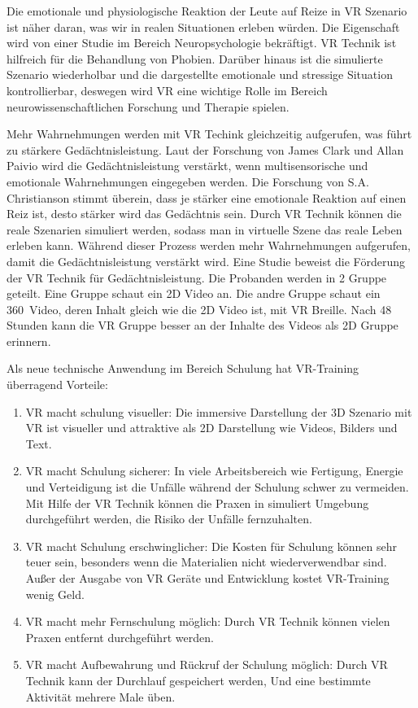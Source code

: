 Die emotionale und physiologische Reaktion der Leute auf Reize in VR Szenario ist näher daran, was wir in realen Situationen erleben würden. Die Eigenschaft wird von einer Studie im Bereich Neuropsychologie bekräftigt. VR Technik ist hilfreich für die Behandlung von Phobien\citep{12}. Darüber hinaus ist die simulierte Szenario wiederholbar und die dargestellte emotionale und stressige Situation kontrollierbar, deswegen wird VR eine wichtige Rolle im Bereich neurowissenschaftlichen Forschung und Therapie spielen.\citep{13}

Mehr Wahrnehmungen werden mit VR Techink gleichzeitig aufgerufen, was führt zu stärkere Gedächtnisleistung. Laut der Forschung von James Clark und Allan Paivio\citep{10} wird die Gedächtnisleistung verstärkt, wenn multisensorische und emotionale Wahrnehmungen eingegeben werden. Die Forschung von S.A. Christianson\citep{11} stimmt überein, dass je stärker eine emotionale Reaktion auf einen Reiz ist, desto stärker wird das Gedächtnis sein. Durch VR Technik können die reale Szenarien simuliert werden, sodass man in virtuelle Szene das reale Leben erleben kann. Während dieser Prozess werden mehr Wahrnehmungen aufgerufen, damit die Gedächtnisleistung verstärkt wird. Eine Studie\citep{12} beweist die Förderung der VR Technik für Gedächtnisleistung. Die Probanden werden in 2 Gruppe geteilt. Eine Gruppe schaut ein 2D Video an. Die andre Gruppe schaut ein 360\degree\ Video, deren Inhalt gleich wie die 2D Video ist, mit VR Breille. Nach 48 Stunden kann die VR Gruppe besser an der Inhalte des Videos als 2D Gruppe erinnern.

Als neue technische Anwendung im Bereich Schulung hat VR-Training überragend Vorteile\citep{15}:

\begin{enumerate}
\item VR macht schulung visueller: Die immersive Darstellung der 3D Szenario mit VR ist visueller und attraktive als 2D Darstellung wie Videos, Bilders und Text.
\item VR macht Schulung sicherer: In viele Arbeitsbereich wie Fertigung, Energie und Verteidigung ist die Unfälle während der Schulung schwer zu vermeiden. Mit Hilfe der VR Technik können die Praxen in simuliert Umgebung durchgeführt werden, die Risiko der Unfälle fernzuhalten.
\item VR macht Schulung erschwinglicher: Die Kosten für Schulung können sehr teuer sein, besonders wenn die Materialien nicht wiederverwendbar sind. Außer der Ausgabe von VR Geräte und Entwicklung kostet VR-Training wenig Geld.
\item VR macht mehr Fernschulung möglich: Durch VR Technik können vielen Praxen entfernt durchgeführt werden.
\item VR macht Aufbewahrung und Rückruf der Schulung möglich: Durch VR Technik kann der Durchlauf gespeichert werden, Und eine bestimmte Aktivität mehrere Male üben.
\end{enumerate}\

